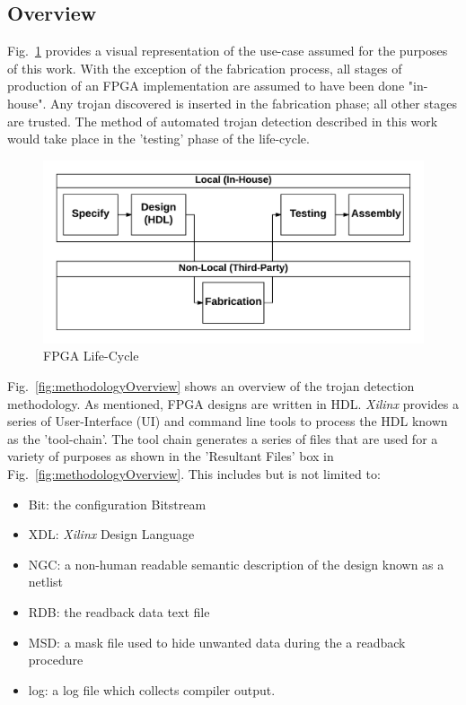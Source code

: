 \documentclass[journal, hidelinks]{IEEEtran}
\begin{document}
\subsection{Overview}
Fig.~\ref{fig:Concept} provides a visual representation of the use-case assumed for the purposes of this work. 
With the exception of the fabrication process, all stages of production of an FPGA implementation are assumed to have been done "in-house". 
Any trojan discovered is inserted in the fabrication phase; all other stages are trusted.  
The method of automated trojan detection described in this work would take place in the 'testing' phase of the life-cycle. 
\begin{figure}[h]
	\centering
	\includegraphics[width=1\linewidth]{Figures/Concept}
	\caption[FPGA Life-Cycle]{FPGA Life-Cycle}
	\label{fig:Concept}
\end{figure}
Fig.~\ref{fig:methodologyOverview} shows an overview of the trojan detection methodology.
As mentioned, FPGA designs are written in HDL.
\textit{Xilinx} provides a series of User-Interface (UI) and command line tools to process the HDL known as the 'tool-chain'.
The tool chain generates a series of files that are used for a variety of purposes as shown in the 'Resultant Files' box in Fig.~\ref{fig:methodologyOverview}.
This includes but is not limited to:
\begin{itemize}
	\item Bit: the configuration Bitstream
	\item XDL: \textit{Xilinx} Design Language
	\item NGC: a non-human readable semantic description of the design known as a netlist
	\item RDB: the readback data text file
	\item MSD: a mask file used to hide unwanted data during the a readback procedure
	\item log: a log file which collects compiler output.
\end{itemize}
\end{document}

